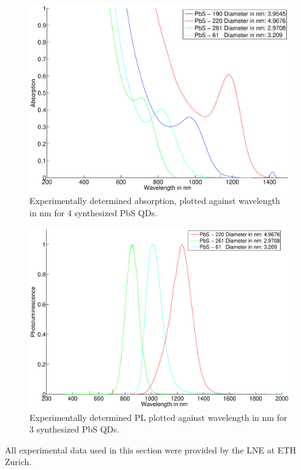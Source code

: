 	\begin{figure}[htpb]
		\includegraphics[width=\textwidth]{Fig/Plots/Abs_PbS.eps}
		\caption{Experimentally determined absorption, plotted against wavelength in nm for 4 synthesized PbS \glspl{QD}.}
		\label{fig:Abs_PbS}
	\end{figure}
	
	\begin{figure}
		\includegraphics[width=\textwidth]{Fig/Plots/PL_PbS.eps}
		\caption{Experimentally determined \gls{PL} plotted against wavelength in nm for 3 synthesized PbS \glspl{QD}.}
		\label{fig:PL_PbS}
	\end{figure}
		
	\begin{REMARK}
		All experimental data used in this section were provided by the \gls{LNE} at ETH Zurich.
	\end{REMARK}

